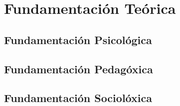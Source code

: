 \chapter{Fundamentación Teórica}\label{chap:fundamentacion}


\section{Fundamentación Psicológica}

\section{Fundamentación Pedagóxica}


\section{Fundamentación Sociolóxica}
